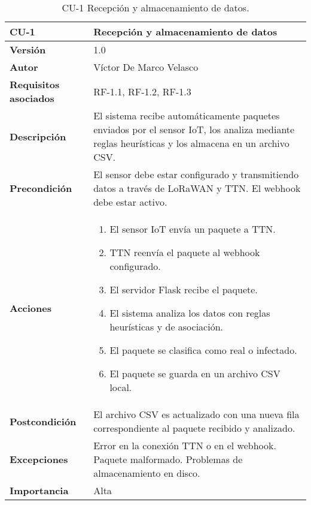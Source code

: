 \begin{table}[p]
	\centering
	\begin{tabularx}{\linewidth}{ p{} p{} }
		\toprule
		\textbf{CU-1}    & Recepción y almacenamiento de datos \\
		\toprule
		\textbf{Versión}              & 1.0 \\
		\textbf{Autor}                & Víctor De Marco Velasco \\
		\textbf{Requisitos asociados} & RF-1.1, RF-1.2, RF-1.3 \\
		\textbf{Descripción}          & El sistema recibe automáticamente paquetes enviados por el sensor IoT, los analiza mediante reglas heurísticas y los almacena en un archivo CSV. \\
		\textbf{Precondición}         & El sensor debe estar configurado y transmitiendo datos a través de LoRaWAN y TTN. El webhook debe estar activo. \\
		\textbf{Acciones}             &
		\begin{enumerate}
			\item El sensor IoT envía un paquete a TTN.
			\item TTN reenvía el paquete al webhook configurado.
			\item El servidor Flask recibe el paquete.
			\item El sistema analiza los datos con reglas heurísticas y de asociación.
			\item El paquete se clasifica como real o infectado.
			\item El paquete se guarda en un archivo CSV local.
		\end{enumerate}\\
		\textbf{Postcondición}        & El archivo CSV es actualizado con una nueva fila correspondiente al paquete recibido y analizado. \\
		\textbf{Excepciones}          & Error en la conexión TTN o en el webhook. Paquete malformado. Problemas de almacenamiento en disco. \\
		\textbf{Importancia}          & Alta \\
		\bottomrule
	\end{tabularx}
	\caption{CU-1 Recepción y almacenamiento de datos.}
\end{table}

